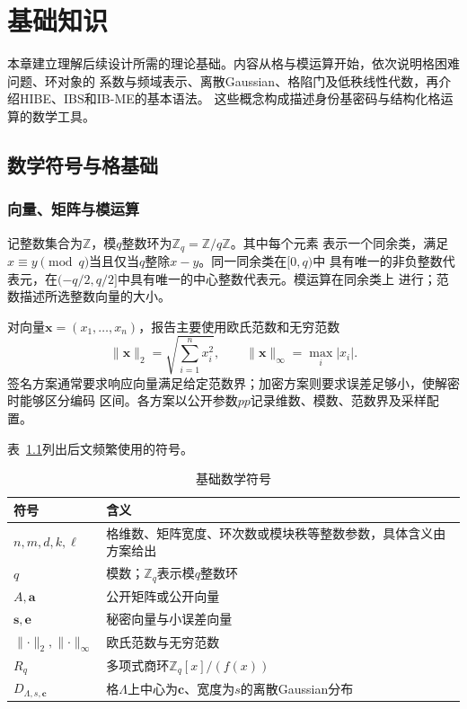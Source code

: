 \chapter{基础知识}
\begin{mathchapterlayout}

本章建立理解后续设计所需的理论基础。内容从格与模运算开始，依次说明格困难问题、环对象的
系数与频域表示、离散Gaussian、格陷门及低秩线性代数，再介绍HIBE、IBS和IB-ME的基本语法。
这些概念构成描述身份基密码与结构化格运算的数学工具。

\section{数学符号与格基础}

\subsection{向量、矩阵与模运算}

记整数集合为$\mathbb Z$，模$q$整数环为$\mathbb Z_q=\mathbb Z/q\mathbb Z$。其中每个元素
表示一个同余类，满足$x\equiv y\pmod q$当且仅当$q$整除$x-y$。同一同余类在$[0,q)$中
具有唯一的非负整数代表元，在$(-q/2,q/2]$中具有唯一的中心整数代表元。模运算在同余类上
进行；范数描述所选整数向量的大小。

对向量$\mathbf x=(x_1,\ldots,x_n)$，报告主要使用欧氏范数和无穷范数
\[
 \lVert\mathbf x\rVert_2=\sqrt{\sum_{i=1}^{n}x_i^2},
 \qquad
 \lVert\mathbf x\rVert_\infty=\max_i|x_i|.
\]
签名方案通常要求响应向量满足给定范数界；加密方案则要求误差足够小，使解密时能够区分编码
区间。各方案以公开参数$pp$记录维数、模数、范数界及采样配置。

表~\ref{tab:foundation-symbols}列出后文频繁使用的符号。

\begin{table}[H]
\centering\small
\caption{基础数学符号}
\label{tab:foundation-symbols}
\begin{tabularx}{\textwidth}{@{}p{}X@{}}
\toprule
\rowcolor{black!8} 符号 & 含义 \\
\midrule
$n,m,d,k,\ell$ & 格维数、矩阵宽度、环次数或模块秩等整数参数，具体含义由方案给出 \\
$q$ & 模数；$\mathbb Z_q$表示模$q$整数环 \\
$A,\mathbf a$ & 公开矩阵或公开向量 \\
$\mathbf s,\mathbf e$ & 秘密向量与小误差向量 \\
$\lVert\cdot\rVert_2,\lVert\cdot\rVert_\infty$ & 欧氏范数与无穷范数 \\
$R_q$ & 多项式商环$\mathbb Z_q[x]/(f(x))$ \\
$D_{\Lambda,s,\mathbf c}$ & 格$\Lambda$上中心为$\mathbf c$、宽度为$s$的离散Gaussian分布 \\
\bottomrule
\end{tabularx}
\end{table}


\end{mathchapterlayout}
